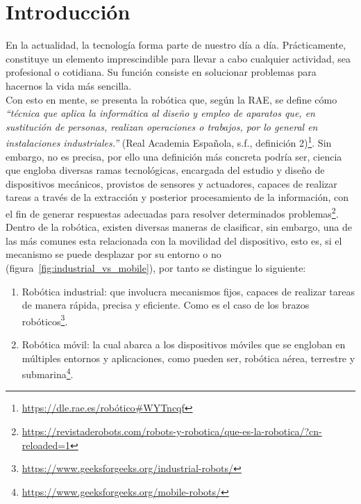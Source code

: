 \chapter{Introducción}
\label{cap:capitulo1}
\setcounter{page}{1}

En la actualidad, la tecnología forma parte de nuestro día a día. Prácticamente, constituye un elemento imprescindible para llevar a cabo cualquier actividad, sea profesional o cotidiana. Su función consiste en solucionar problemas para hacernos la vida más sencilla.\\

Con esto en mente, se presenta la robótica que, según la \ac{RAE}, se define cómo \emph{``técnica que aplica la informática al diseño y empleo de aparatos que, en sustitución de personas, realizan operaciones o trabajos, por lo general en instalaciones industriales.''} (Real Academia Española, s.f., definición 2)\footnote[1]{\href{https://dle.rae.es/rob\%C3\%B3tico\#WYTncqf}{https://dle.rae.es/robótico\#WYTncqf}}. Sin embargo, no es precisa, por ello una definición más concreta podría ser, ciencia que engloba diversas ramas tecnológicas, encargada del estudio y diseño de dispositivos mecánicos, provistos de sensores y actuadores, capaces de realizar tareas a través de la extracción y posterior procesamiento de la información, con el fin de generar respuestas adecuadas para resolver determinados problemas\footnote[2]{\url{https://revistaderobots.com/robots-y-robotica/que-es-la-robotica/?cn-reloaded=1}}.\\

Dentro de la robótica, existen diversas maneras de clasificar, sin embargo, una de las más comunes esta relacionada con la movilidad del dispositivo, esto es, si el mecanismo se puede desplazar por su entorno o no (figura~\ref{fig:industrial_vs_mobile}), por tanto se distingue lo siguiente:

\begin{enumerate}
	\item Robótica industrial: que involucra mecanismos fijos, capaces de realizar tareas de manera rápida, precisa y eficiente. Como es el caso de los brazos robóticos\footnote[3]{\url{https://www.geeksforgeeks.org/industrial-robots/}}.
	\item Robótica móvil: la cual abarca a los dispositivos móviles que se engloban en múltiples entornos y aplicaciones, como pueden ser, robótica aérea, terrestre y submarina\footnote[4]{\url{https://www.geeksforgeeks.org/mobile-robots/}}.
\end{enumerate}

